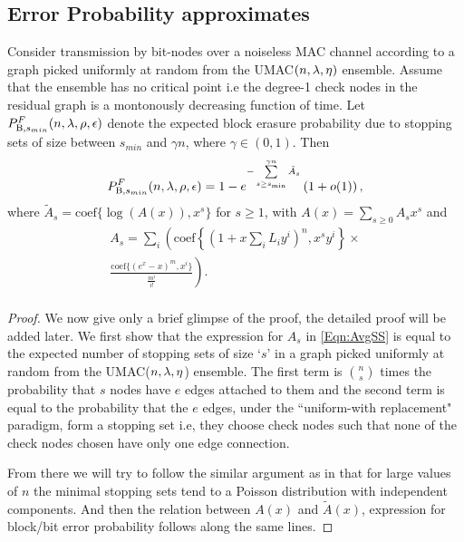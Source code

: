 \subsection{Error Probability approximates}
\label{sec:UMACapproximate}
\begin{theorem}
Consider transmission by bit-nodes over a noiseless MAC channel according to a graph picked uniformly at random from the UMAC$(n,\lambda,\eta)$ ensemble. Assume that the ensemble has no critical point i.e the degree-1 check nodes in the residual graph is a montonously decreasing function of time. Let $P_{\text{B},s_{min}}^{F}(n,\lambda,\rho,\epsilon)$ denote the expected block erasure probability due to stopping sets of size between $s_{min}$ and  $\gamma n$, where $\gamma\in (0,1)$. Then
\begin{align}
P_{\text{B},s_{min}}^{F}(n,\lambda,\rho,\epsilon)=1-e^{-\sum\limits_{s\geq s_{\text{min}}}^{\gamma n}\tilde{A}_{s}}\left(1+o(1)\right),
\label{Eqn:PBAnalytic}
\end{align}
where $\tilde{A}_{s}=\text{coef}\{\log(A(x)),x^s\}$ for $s\geq 1$, with $A(x)=\sum_{s\geq 0} A_{s}x^s$ and
\begin{multline}\label{Eqn:AvgSS}
A_{s}=\sum_{i}\left(\text{coef}\left\lbrace (1+x\sum_{i}L_{i}y^{i})^{n}, x^{s}y^{i} \right\rbrace \right.\times \\
\left.\frac{\text{coef}\lbrace (e^x -x)^{m},x^{i}\rbrace }{\frac{m^i}{i!}}\right). \\
\end{multline}
\label{Thm:UMACFloor}
\end{theorem}

\begin{proof}
We now give only a brief glimpse of the proof, the detailed proof will be added later. We first show that the expression for $A_{s}$ in \eqref{Eqn:AvgSS} is equal to the expected number of stopping sets of size `$s$' in a graph picked uniformly at random from the UMAC($n,\lambda,\eta$) ensemble. The first term is $\binom{n}{s}$ times the probability that $s$ nodes have $e$ edges attached to them and the second term is equal to the probability that the $e$ edges, under the ``uniform-with replacement" paradigm, form a stopping set i.e, they choose check nodes such that none of the check nodes chosen have only one edge connection.

From there we will try to follow the similar argument as in \cite{richardson2008modern} that for large values of $n$ the minimal stopping sets tend to a Poisson distribution with independent components. And then the relation between $A(x)$ and $\tilde{A}(x)$, expression for block/bit error probability follows along the same lines.
\end{proof}

